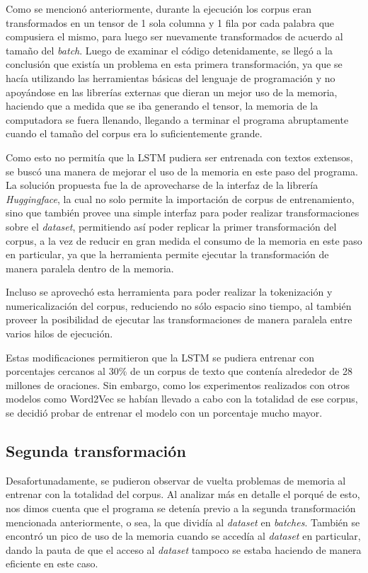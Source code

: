 Como se mencionó anteriormente, durante la ejecución los corpus eran transformados en un tensor de 1 sola columna y 1 fila por cada palabra que compusiera el mismo, para luego ser nuevamente transformados de acuerdo al tamaño del \textit{batch}. Luego de examinar el código detenidamente, se llegó a la conclusión que existía un problema en esta primera transformación, ya que se hacía utilizando las herramientas básicas del lenguaje de programación y no apoyándose en las librerías externas que dieran un mejor uso de la memoria, haciendo que a medida que se iba generando el tensor, la memoria de la computadora se fuera llenando, llegando a terminar el programa abruptamente cuando el tamaño del corpus era lo suficientemente grande.

Como esto no permitía que la LSTM pudiera ser entrenada con textos extensos, se buscó una manera de mejorar el uso de la memoria en este paso del programa. La solución propuesta fue la de aprovecharse de la interfaz de la librería \textit{Huggingface}, la cual no solo permite la importación de corpus de entrenamiento, sino que también provee una simple interfaz para poder realizar transformaciones sobre el \textit{dataset}, permitiendo así poder replicar la primer transformación del corpus, a la vez de reducir en gran medida el consumo de la memoria en este paso en particular, ya que la herramienta permite ejecutar la transformación de manera paralela dentro de la memoria.

Incluso se aprovechó esta herramienta para poder realizar la tokenización y numericalización del corpus, reduciendo no sólo espacio sino tiempo, al también proveer la posibilidad de ejecutar las transformaciones de manera paralela entre varios hilos de ejecución.

Estas modificaciones permitieron que la LSTM se pudiera entrenar con porcentajes cercanos al 30\% de un corpus de texto que contenía alrededor de 28 millones de oraciones. Sin embargo, como los experimentos realizados con otros modelos como Word2Vec se habían llevado a cabo con la totalidad de ese corpus, se decidió probar de entrenar el modelo con un porcentaje mucho mayor.

\subsection{Segunda transformación}

Desafortunadamente, se pudieron observar de vuelta problemas de memoria al entrenar con la totalidad del corpus. Al analizar más en detalle el porqué de esto, nos dimos cuenta que el programa se detenía previo a la segunda transformación mencionada anteriormente, o sea, la que dividía al \textit{dataset} en \textit{batches}. También se encontró un pico de uso de la memoria cuando se accedía al \textit{dataset} en particular, dando la pauta de que el acceso al \textit{dataset} tampoco se estaba haciendo de manera eficiente en este caso.

